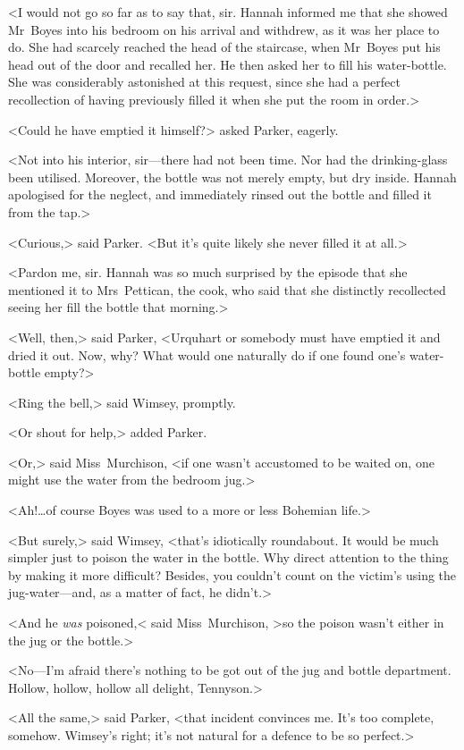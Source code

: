 <I would not go so far as to say that, sir. Hannah informed me that she showed Mr~Boyes into his bedroom on his arrival and withdrew, as it was her place to do. She had scarcely reached the head of the staircase, when Mr~Boyes put his head out of the door and recalled her. He then asked her to fill his water-bottle. She was considerably astonished at this request, since she had a perfect recollection of having previously filled it when she put the room in order.>

<Could he have emptied it himself?> asked Parker, eagerly.

<Not into his interior, sir—there had not been time. Nor had the drinking-glass been utilised. Moreover, the bottle was not merely empty, but dry inside. Hannah apologised for the neglect, and immediately rinsed out the bottle and filled it from the tap.>

<Curious,> said Parker. <But it's quite likely she never filled it at all.>

<Pardon me, sir. Hannah was so much surprised by the episode that she mentioned it to Mrs~Pettican, the cook, who said that she distinctly recollected seeing her fill the bottle that morning.>

<Well, then,> said Parker, <Urquhart or somebody must have emptied it and dried it out. Now, why? What would one naturally do if one found one's water-bottle empty?>

<Ring the bell,> said Wimsey, promptly.

<Or shout for help,> added Parker.

<Or,> said Miss~Murchison, <if one wasn't accustomed to be waited on, one might use the water from the bedroom jug.>

<Ah!\dots of course Boyes was used to a more or less Bohemian life.>

<But surely,> said Wimsey, <that's idiotically roundabout. It would be much simpler just to poison the water in the bottle. Why direct attention to the thing by making it more difficult? Besides, you couldn't count on the victim's using the jug-water—and, as a matter of fact, he didn't.>

<And he \emph{was} poisoned,< said Miss~Murchison, >so the poison wasn't either in the jug or the bottle.>

<No—I'm afraid there's nothing to be got out of the jug and bottle department. Hollow, hollow, hollow all delight, Tennyson.>

<All the same,> said Parker, <that incident convinces me. It's too complete, somehow. Wimsey's right; it's not natural for a defence to be so perfect.>

